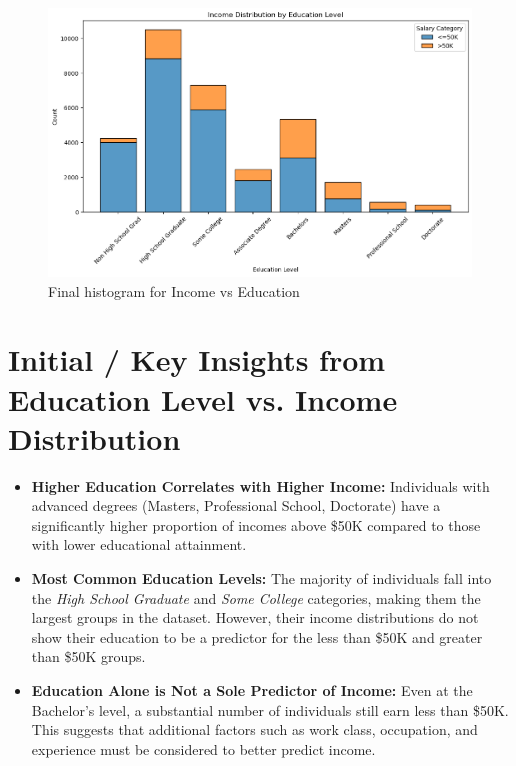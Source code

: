 \documentclass[journal]{IEEEtran}
\begin{document}
\begin{figure}[h]
    \centering
    \includegraphics[width=\columnwidth]{hist_4.png}  %
    \caption{Final histogram for Income vs Education}
    \label{fig:Final histogram for Income vs Education}
\end{figure}

\section{Initial / Key Insights from Education Level vs. Income Distribution}

\begin{itemize}
    \item \textbf{Higher Education Correlates with Higher Income:} Individuals with advanced degrees (Masters, Professional School, Doctorate) have a significantly higher proportion of incomes above \$50K compared to those with lower educational attainment.
    
    \item \textbf{Most Common Education Levels:} The majority of individuals fall into the \textit{High School Graduate} and \textit{Some College} categories, making them the largest groups in the dataset. However, their income distributions do not show their education to be a predictor for the less than \$50K and greater than \$50K groups.
    
    \item \textbf{Education Alone is Not a Sole Predictor of Income:} Even at the Bachelor's level, a substantial number of individuals still earn less than \$50K. This suggests that additional factors such as work class, occupation, and experience must be considered to better predict income.
\end{itemize}
\end{document}
